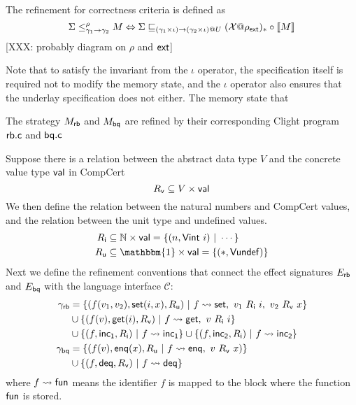 \documentclass[sigplan,10pt,authordraft]{acmart}
\begin{document}
The refinement for correctness criteria is defined as
\[
  \Sigma \le^\rho_{\gamma_1 \rightarrow \gamma_2} M \Leftrightarrow
  \Sigma \sqsubseteq_{(\gamma_1 \times \iota) \rightarrow (\gamma_2 \times \iota)@U}
  (\mathcal{X}@\rho_{ \mathsf{ext} })_* \circ
    \llbracket M \rrbracket
\]
[XXX: probably diagram on $\rho$ and $ \mathsf{ext} $]

Note that to satisfy the invariant from the $\iota$ operator,
the specification itself is required
not to modify the memory state,
and the $\iota$ operator also ensures that the underlay specification
does not either. The memory state that

\begin{example}
  The strategy $M_{ \mathsf{rb} }$ and $M_{ \mathsf{bq} }$ are refined by their corresponding
  Clight program $ \mathsf{rb.c} $ and $ \mathsf{bq.c} $

  Suppose there is a relation between the abstract data type $V$ and the
  concrete value type $ \mathsf{val} $ in CompCert
  \[
    R_{ \mathsf{v} } \subseteq V \times  \mathsf{val} 
  \]
  We then define the relation between the natural numbers and CompCert values,
  and the relation between the unit type and undefined values.
  \begin{align*}
    R_\kw{i} & \subseteq \mathbb{N} \times \kw{val} = \{(n, \kw{Vint}\ i)\ |\ \cdots \}\\
    R_\kw{u} & \subseteq \mathbbm{1} \times \kw{val} = \{(*, \kw{Vundef}) \}
  \end{align*}
  Next we define the refinement conventions that connect the effect signatures
  $E_{ \mathsf{rb} }$ and $E_{ \mathsf{bq} }$ with the language interface $\mathcal{C}$:
  \begin{align*}
    \gamma_\kw{rb} & = \{ (f(v_1, v_2), \kw{set}(i, x), R_\kw{u}) \ |\
                f \leadsto \kw{set},\ v_1\ R_\kw{i}\ i,\ v_2\ R_\kw{v}\ x\} \\
              & \cup \{ (f(v), \kw{get}(i), R_\kw{v})\ |\
                f \leadsto \kw{get},\ v\ R_\kw{i}\ i\}\\
              & \cup \{ (f, \kw{inc_1}, R_\kw{i}) \ |\
                f \leadsto \kw{inc_1}\} \cup \{ (f, \kw{inc_2}, R_\kw{i}) \ |\
                f \leadsto \kw{inc_2}\}\\
    \gamma_\kw{bq} & = \{ (f(v), \kw{enq}(x), R_\kw{u} \ |\
                f \leadsto \kw{enq},\ v\ R_\kw{v}\ x)\} \\
              & \cup \{ (f, \kw{deq}, R_\kw{v})\ |\ 
                f \leadsto \kw{deq}\}
  \end{align*}
  where $f \leadsto  \mathsf{fun} $ means the identifier $f$ is mapped to the block
  where the function $ \mathsf{fun} $ is stored.


\end{example}
\end{document}
